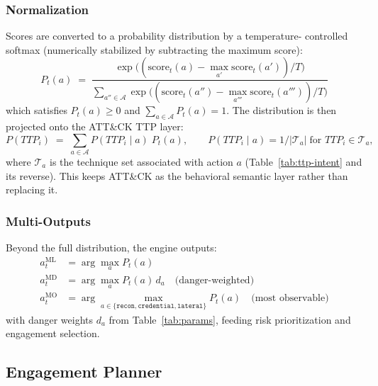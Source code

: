 \documentclass[11pt]{article}
\newcommand{\act}[1]{\texttt{#1}}
\begin{document}
\subsubsection{Normalization}
\label{sec:softmax}

Scores are converted to a probability distribution by a temperature-
controlled softmax (numerically stabilized by subtracting the maximum
score):
\begin{equation}
\label{eq:softmax}
P_t(a) \;=\; \frac{\exp\!\big((\mathrm{score}_t(a) -
\max_{a'}\mathrm{score}_t(a'))/T\big)}
{\sum_{a'' \in \mathcal{A}} \exp\!\big((\mathrm{score}_t(a'') -
\max_{a'''}\mathrm{score}_t(a'''))/T\big)}
\end{equation}
which satisfies $P_t(a) \geq 0$ and $\sum_{a \in \mathcal{A}} P_t(a) = 1$.
The distribution is then projected onto the ATT\&CK TTP layer:
\begin{equation}
\label{eq:ttp-proj}
P(\mathit{TTP}_i) \;=\; \sum_{a \in \mathcal{A}}
P(\mathit{TTP}_i \mid a)\; P_t(a),
\qquad
P(\mathit{TTP}_i \mid a) = 1/|\mathcal{T}_a| \;\text{for } \mathit{TTP}_i
\in \mathcal{T}_a,
\end{equation}
where $\mathcal{T}_a$ is the technique set associated with action $a$
(Table~\ref{tab:ttp-intent} and its reverse). This keeps ATT\&CK as the
behavioral semantic layer rather than replacing it.

\subsubsection{Multi-Outputs}

Beyond the full distribution, the engine outputs:
\begin{align}
a^{\mathrm{ML}}_t &= \arg\max_a P_t(a) \label{eq:most-likely} \\
a^{\mathrm{MD}}_t &= \arg\max_a P_t(a)\, d_a \quad\text{(danger-weighted)}
\label{eq:most-dangerous} \\
a^{\mathrm{MO}}_t &= \arg\max_{a \in \{\act{recon},\act{credential},
\act{lateral}\}} P_t(a) \quad\text{(most observable)}
\label{eq:most-observable}
\end{align}
with danger weights $d_a$ from Table~\ref{tab:params}, feeding risk
prioritization and engagement selection.

\subsection{Engagement Planner}
\label{sec:engagement}
\end{document}
